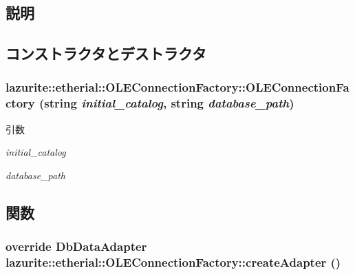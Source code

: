 \subsection{説明}


\subsection{コンストラクタとデストラクタ}
\hypertarget{classlazurite_1_1etherial_1_1_o_l_e_connection_factory_a6b0b792196721a06b29a3a7b656e211e}{
\subsubsection[{OLEConnectionFactory}]{\setlength{\rightskip}{0pt plus 5cm}lazurite::etherial::OLEConnectionFactory::OLEConnectionFactory (string {\em initial\_\-catalog}, \/  string {\em database\_\-path})}}
\label{classlazurite_1_1etherial_1_1_o_l_e_connection_factory_a6b0b792196721a06b29a3a7b656e211e}

\begin{DoxyParams}{引数}
\item[{\em initial\_\-catalog}]\item[{\em database\_\-path}]\end{DoxyParams}


\subsection{関数}
\hypertarget{classlazurite_1_1etherial_1_1_o_l_e_connection_factory_a75b252525f953d501a826d3bb242c69c}{
\subsubsection[{createAdapter}]{\setlength{\rightskip}{0pt plus 5cm}override DbDataAdapter lazurite::etherial::OLEConnectionFactory::createAdapter ()}}
\label{classlazurite_1_1etherial_1_1_o_l_e_connection_factory_a75b252525f953d501a826d3bb242c69c}


